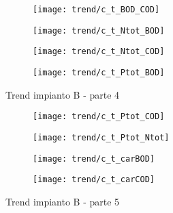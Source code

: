 \begin{sidewaysfigure}[h]\ContinuedFloat
	\renewcommand*\thesubfigure{(\arabic{subfigure})}
	\begin{subfigure}{0.49\textwidth}
		\texttt{[image: trend/c\_t\_BOD\_COD]}
		\caption{}
		\centering
	\end{subfigure}
	\begin{subfigure}{0.49\textwidth}
		\texttt{[image: trend/c\_t\_Ntot\_BOD]}
		\caption{}
		\centering
	\end{subfigure}

	\begin{subfigure}{0.49\textwidth}
		\texttt{[image: trend/c\_t\_Ntot\_COD]}
		\caption{}
		\centering
	\end{subfigure}
	\begin{subfigure}{0.49\textwidth}
		\texttt{[image: trend/c\_t\_Ptot\_BOD]}	
		\caption{}
		\centering
	\end{subfigure}
	\caption{Trend impianto B - parte 4}
\end{sidewaysfigure}

\begin{sidewaysfigure}[h]\ContinuedFloat
	\renewcommand*\thesubfigure{(\arabic{subfigure})}
	\begin{subfigure}{0.49\textwidth}
		\texttt{[image: trend/c\_t\_Ptot\_COD]}
		\caption{}
		\centering
	\end{subfigure}
	\begin{subfigure}{0.49\textwidth}
		\texttt{[image: trend/c\_t\_Ptot\_Ntot]}
		\caption{}
		\centering
	\end{subfigure}

	\begin{subfigure}{0.49\textwidth}
		\texttt{[image: trend/c\_t\_carBOD]}
		\caption{}
		\centering
	\end{subfigure}
	\begin{subfigure}{0.49\textwidth}
		\texttt{[image: trend/c\_t\_carCOD]}	
		\caption{}
		\centering
	\end{subfigure}
	\caption{Trend impianto B - parte 5}
\end{sidewaysfigure}

